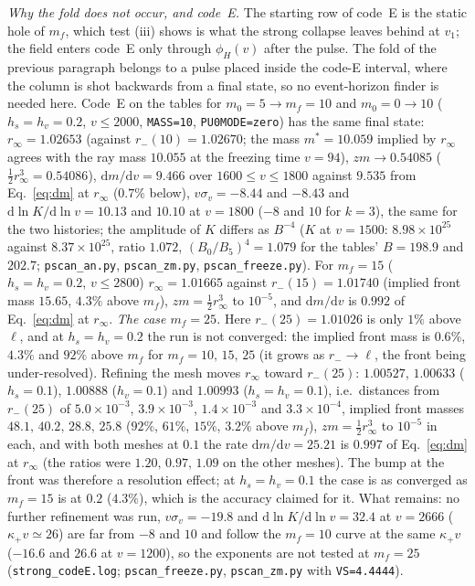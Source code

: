 \documentclass[11pt]{article}
\begin{document}
\emph{Why the fold does not occur, and code~E.} The starting row of code~E is the static hole of $m_f$, which test (iii) shows is what the strong collapse leaves behind at $v_1$; the field enters code~E only through $\phi_H(v)$ after the pulse. The fold of the previous paragraph belongs to a pulse placed inside the code-E interval, where the column is shot backwards from a final state, so no event-horizon finder is needed here. Code~E on the tables for $m_0=5\to m_f=10$ and $m_0=0\to10$ ($h_s=h_v=0.2$, $v\le2000$, \texttt{MASS=10}, \texttt{PU0MODE=zero}) has the same final state: $r_\infty=1.02653$ (against $r_-(10)=1.02670$; the mass $m^{*}=10.059$ implied by $r_\infty$ agrees with the ray mass $10.055$ at the freezing time $v=94$), $zm\to0.54085$ ($\tfrac12r_\infty^{3}=0.54086$), $\mathrm dm/\mathrm dv=9.466$ over $1600\le v\le1800$ against $9.535$ from Eq.~\eqref{eq:dm} at $r_\infty$ ($0.7\%$ below), $v\sigma_v=-8.44$ and $-8.43$ and $\mathrm d\ln K/\mathrm d\ln v=10.13$ and $10.10$ at $v=1800$ ($-8$ and $10$ for $k=3$), the same for the two histories; the amplitude of $K$ differs as $B^{-4}$ ($K$ at $v=1500$: $8.98\times10^{25}$ against $8.37\times10^{25}$, ratio $1.072$, $(B_{0}/B_{5})^{4}=1.079$ for the tables' $B=198.9$ and $202.7$; \texttt{pscan\_an.py}, \texttt{pscan\_zm.py}, \texttt{pscan\_freeze.py}). For $m_f=15$ ($h_s=h_v=0.2$, $v\le2800$) $r_\infty=1.01665$ against $r_-(15)=1.01740$ (implied front mass $15.65$, $4.3\%$ above $m_f$), $zm=\tfrac12r_\infty^{3}$ to $10^{-5}$, and $\mathrm dm/\mathrm dv$ is $0.992$ of Eq.~\eqref{eq:dm} at $r_\infty$. \emph{The case $m_f=25$.} Here $r_-(25)=1.01026$ is only $1\%$ above $\ell$, and at $h_s=h_v=0.2$ the run is not converged: the implied front mass is $0.6\%$, $4.3\%$ and $92\%$ above $m_f$ for $m_f=10,\,15,\,25$ (it grows as $r_-\to\ell$, the front being under-resolved). Refining the mesh moves $r_\infty$ toward $r_-(25)$: $1.00527$, $1.00633$ ($h_s=0.1$), $1.00888$ ($h_v=0.1$) and $1.00993$ ($h_s=h_v=0.1$), i.e.\ distances from $r_-(25)$ of $5.0\times10^{-3}$, $3.9\times10^{-3}$, $1.4\times10^{-3}$ and $3.3\times10^{-4}$, implied front masses $48.1,\,40.2,\,28.8,\,25.8$ ($92\%$, $61\%$, $15\%$, $3.2\%$ above $m_f$), $zm=\tfrac12r_\infty^{3}$ to $10^{-5}$ in each, and with both meshes at $0.1$ the rate $\mathrm dm/\mathrm dv=25.21$ is $0.997$ of Eq.~\eqref{eq:dm} at $r_\infty$ (the ratios were $1.20,\,0.97,\,1.09$ on the other meshes). The bump at the front was therefore a resolution effect; at $h_s=h_v=0.1$ the case is as converged as $m_f=15$ is at $0.2$ ($4.3\%$), which is the accuracy claimed for it. What remains: no further refinement was run, $v\sigma_v=-19.8$ and $\mathrm d\ln K/\mathrm d\ln v=32.4$ at $v=2666$ ($\kappa_+v\simeq26$) are far from $-8$ and $10$ and follow the $m_f=10$ curve at the same $\kappa_+v$ ($-16.6$ and $26.6$ at $v=1200$), so the exponents are not tested at $m_f=25$ (\texttt{strong\_codeE.log}; \texttt{pscan\_freeze.py}, \texttt{pscan\_zm.py} with \texttt{VS=4.4444}).
\end{document}
